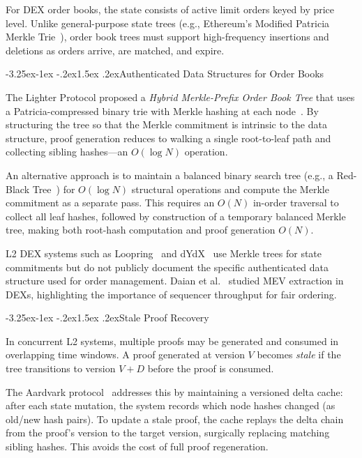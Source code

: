 \documentclass[letterpaper,twocolumn,10pt]{article}
\makeatletter
\renewcommand{\subsection}{\@startsection{subsection}{2}{\z@}%
  {-3.25ex\@plus -1ex \@minus -.2ex}{1.5ex \@plus .2ex}{\normalfont\normalsize\bfseries}}
\makeatother
\begin{document}
For DEX order books, the state consists of active limit orders keyed by price level.
Unlike general-purpose state trees (e.g., Ethereum's Modified Patricia Merkle Trie~\cite{wood2014ethereum}), order book trees must support high-frequency insertions and deletions as orders arrive, are matched, and expire.

\subsection{Authenticated Data Structures for Order Books}

The Lighter Protocol proposed a \emph{Hybrid Merkle-Prefix Order Book Tree} that uses a Patricia-compressed binary trie with Merkle hashing at each node~\cite{lighter2023}.
By structuring the tree so that the Merkle commitment is intrinsic to the data structure, proof generation reduces to walking a single root-to-leaf path and collecting sibling hashes---an $O(\log N)$ operation.

An alternative approach is to maintain a balanced binary search tree (e.g., a Red-Black Tree~\cite{cormen2009introduction, bayer1972symmetric}) for $O(\log N)$ structural operations and compute the Merkle commitment as a separate pass.
This requires an $O(N)$ in-order traversal to collect all leaf hashes, followed by construction of a temporary balanced Merkle tree, making both root-hash computation and proof generation $O(N)$.

L2 DEX systems such as Loopring~\cite{wang2019loopring} and dYdX~\cite{dydx2021} use Merkle trees for state commitments but do not publicly document the specific authenticated data structure used for order management.
Daian et al.~\cite{daian2020flash} studied MEV extraction in DEXs, highlighting the importance of sequencer throughput for fair ordering.

\subsection{Stale Proof Recovery}

In concurrent L2 systems, multiple proofs may be generated and consumed in overlapping time windows.
A proof generated at version $V$ becomes \emph{stale} if the tree transitions to version $V + D$ before the proof is consumed.

The Aardvark protocol~\cite{aardvark2023} addresses this by maintaining a versioned delta cache: after each state mutation, the system records which node hashes changed (as old/new hash pairs).
To update a stale proof, the cache replays the delta chain from the proof's version to the target version, surgically replacing matching sibling hashes.
This avoids the cost of full proof regeneration.
\end{document}

